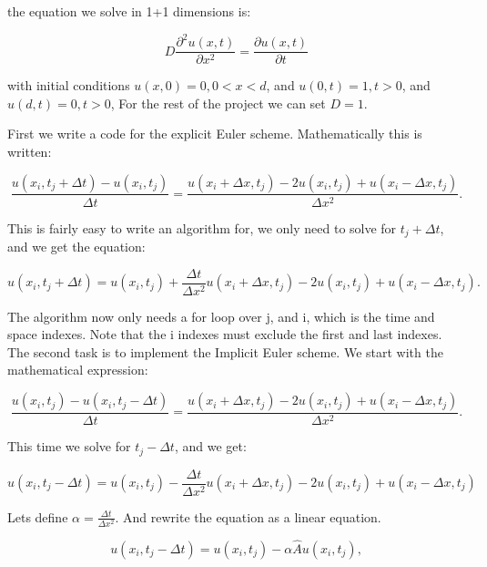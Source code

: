 \documentclass[english,a4paper,12pt]{article}
\begin{document}
the equation we solve in 1+1 dimensions is:

\begin{equation}
D \frac{\partial^2 u(x,t)}{\partial x^2} = \frac{\partial u(x,t)}{\partial t}
\end{equation}

with initial conditions $u(x,0) = 0, 0<x<d$, and $u(0,t) = 1, t>0$, and $u(d,t) = 0, t>0$, For the rest of the project we can set $D=1$.

First we write a code for the explicit Euler scheme. Mathematically this is written:

\begin{equation}
\frac{u(x_i,t_j+\Delta t)-u(x_i,t_j)}{\Delta t} = \frac{u(x_i+\Delta x,t_j)-2u(x_i,t_j)+u(x_i-\Delta x,t_j)}{\Delta x^2}.
\end{equation}

This is fairly easy to write an algorithm for, we only need to solve for $t_j + \Delta t$, and we get the equation:

\begin{equation}
u(x_i,t_j+\Delta t) = u(x_i,t_j) + \frac{\Delta t}{\Delta x^2} u(x_i+\Delta x,t_j)-2u(x_i,t_j)+u(x_i-\Delta x,t_j).
\end{equation}

The algorithm now only needs a for loop over j, and i, which is the time and space indexes. Note that the i indexes must exclude
the first and last indexes.
The second task is to implement the Implicit Euler scheme. We start with the mathematical expression:

\begin{equation}
\frac{u(x_i,t_j)-u(x_i,t_j-\Delta t)}{\Delta t} = \frac{u(x_i+\Delta x,t_j)-2u(x_i,t_j)+u(x_i-\Delta x,t_j)}{\Delta x^2}.
\end{equation}

This time we solve for $t_j - \Delta t$, and we get:

\begin{equation}
u(x_i,t_j-\Delta t) = u(x_i,t_j) - \frac{\Delta t}{\Delta x^2} u(x_i+\Delta x,t_j)-2u(x_i,t_j)+u(x_i-\Delta x,t_j)
\end{equation}

Lets define $\alpha = \frac{\Delta t}{\Delta x^2}$. And rewrite the equation as a linear equation.

\begin{equation}
u(x_i,t_j-\Delta t) = u(x_i,t_j) -\alpha \hat A u(x_i,t_j),
\end{equation}
\end{document}
